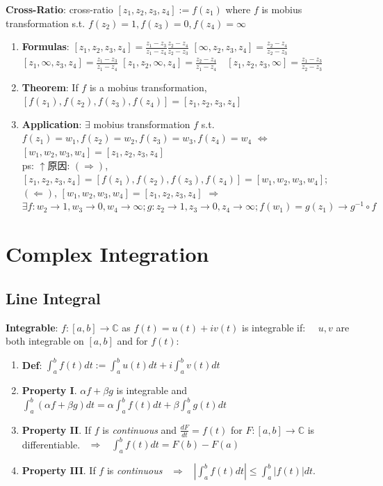 \documentclass[9pt]{article}
\begin{document}
\textbf{Cross-Ratio}: cross-ratio $[z_1,z_2,z_3,z_4]:=f(z_1)$ where $f$ is mobius transformation s.t. $f(z_2)=1,f(z_3)=0,f(z_4)=\infty$

\begin{enumerate}[itemsep=-2pt, topsep=-2pt]
    \item \textbf{Formulas}: {\footnotesize $[z_1,z_2,z_3,z_4]=\frac{z_1-z_3}{z_1-z_4}\frac{z_2-z_4}{z_2-z_3}$ \quad $[\infty,z_2,z_3,z_4]=\frac{z_2-z_4}{z_2-z_3}$ \quad $[z_1,\infty,z_3,z_4]=\frac{z_1-z_3}{z_1-z_4}$ \quad $[z_1,z_2,\infty,z_4]=\frac{z_2-z_4}{z_1-z_4} \quad [z_1,z_2,z_3,\infty]=\frac{z_1-z_3}{z_2-z_3}$}
    \item \textbf{Theorem}: If $f$ is a mobius transformation, $[f(z_1),f(z_2),f(z_3),f(z_4)]=[z_1,z_2,z_3,z_4]$ \qquad {}
    \item \textbf{Application}: {\small $\exists$ mobius transformation $f$ s.t. $f(z_1)=w_1,f(z_2)=w_2,f(z_3)=w_3,f(z_4)=w_4$ \quad \quad $\Leftrightarrow$ \quad $[w_1,w_2,w_3,w_4]=[z_1,z_2,z_3,z_4]$} \\
    ps: {\tiny $\uparrow$原因: $(\Rightarrow)$,$[z_1,z_2,z_3,z_4]=[f(z_1),f(z_2),f(z_3),f(z_4)]=[w_1,w_2,w_3,w_4]$; $(\Leftarrow)$, $[w_1,w_2,w_3,w_4]=[z_1,z_2,z_3,z_4]$ $\Rightarrow$ $\exists f:w_2\to1,w_3\to0,w_4\to\infty;g:z_2\to1,z_3\to0,z_4\to\infty;f(w_1)=g(z_1)\rightarrow g^{-1}\circ f$}
\end{enumerate}


\section{Complex Integration} %

\subsection{Line Integral} %

\textbf{Integrable}: $f:[a,b]\to \mathbb{C}$ as $f(t)=u(t)+iv(t)$ is integrable if: \ \ $u,v$ are both integrable on $[a,b]$ and for $f(t)$:

\begin{enumerate}[itemsep=-2pt, topsep=-2pt]
    \item \textbf{Def}: $\int_a^b f(t)dt:=\int_a^b u(t)dt+i\int_a^b v(t)dt$
    \item \textbf{Property I}. $\alpha f+\beta g$ is integrable and $\int_a^b(\alpha f+\beta g)dt=\alpha\int_a^b f(t)dt+\beta\int_a^b g(t)dt$
    \item \textbf{Property II}. If $f$ is \textit{continuous} and $\frac{dF}{dt}=f(t)$ for $F:[a,b]\to\mathbb{C}$ is differentiable. \ $\Rightarrow$ \ $\int_a^b f(t)dt=F(b)-F(a)$
    \item \textbf{Property III}. If $f$ is \textit{continuous} \ $\Rightarrow$ \ $\left|\int_a^b f(t)dt\right|\leq\int_a^b|f(t)|dt$.
\end{enumerate}
\end{document}
